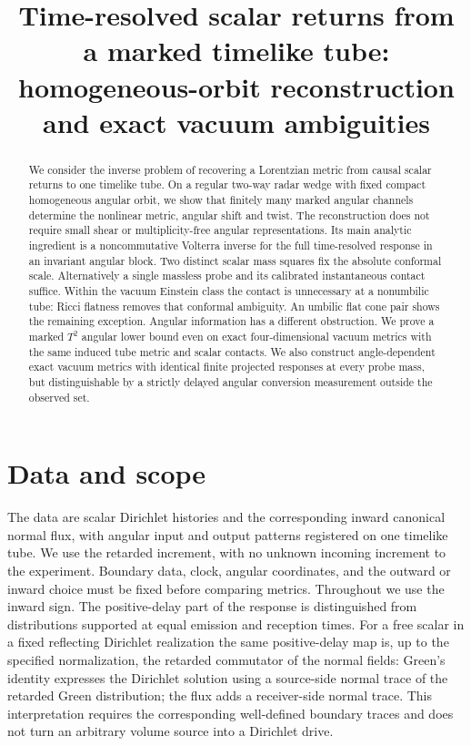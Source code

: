 \documentclass[11pt]{article}
\title{Time-resolved scalar returns from a marked timelike tube:\\
homogeneous-orbit reconstruction and exact vacuum ambiguities}
\author{}
\date{}
\begin{document}
\maketitle

\begin{abstract}
We consider the inverse problem of recovering a Lorentzian metric from causal scalar returns to one timelike tube. On a regular two-way radar wedge with fixed compact homogeneous angular orbit, we show that finitely many marked angular channels determine the nonlinear metric, angular shift and twist. The reconstruction does not require small shear or multiplicity-free angular representations. Its main analytic ingredient is a noncommutative Volterra inverse for the full time-resolved response in an invariant angular block. Two distinct scalar mass squares fix the absolute conformal scale. Alternatively a single massless probe and its calibrated instantaneous contact suffice. Within the vacuum Einstein class the contact is unnecessary at a nonumbilic tube: Ricci flatness removes that conformal ambiguity. An umbilic flat cone pair shows the remaining exception. Angular information has a different obstruction. We prove a marked \(T^2\) angular lower bound even on exact four-dimensional vacuum metrics with the same induced tube metric and scalar contacts. We also construct angle-dependent exact vacuum metrics with identical finite projected responses at every probe mass, but distinguishable by a strictly delayed angular conversion measurement outside the observed set.
\end{abstract}

\section{Data and scope}

The data are scalar Dirichlet histories and the corresponding inward canonical normal flux, with angular input and output patterns registered on one timelike tube. We use the retarded increment, with no unknown incoming increment to the experiment. Boundary data, clock, angular coordinates, and the outward or inward choice must be fixed before comparing metrics. Throughout we use the inward sign. The positive-delay part of the response is distinguished from distributions supported at equal emission and reception times. For a free scalar in a fixed reflecting Dirichlet realization the same positive-delay map is, up to the specified normalization, the retarded commutator of the normal fields: Green's identity expresses the Dirichlet solution using a source-side normal trace of the retarded Green distribution; the flux adds a receiver-side normal trace. This interpretation requires the corresponding well-defined boundary traces and does not turn an arbitrary volume source into a Dirichlet drive.
\end{document}
